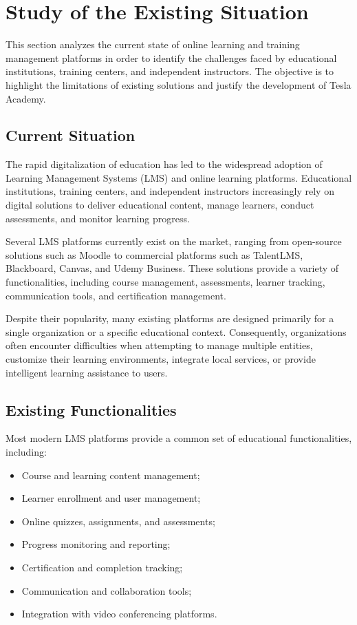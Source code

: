\section{Study of the Existing Situation}

This section analyzes the current state of online learning and training management
platforms in order to identify the challenges faced by educational institutions, training
centers, and independent instructors. The objective is to highlight the limitations of
existing solutions and justify the development of Tesla Academy.

\subsection{Current Situation}

The rapid digitalization of education has led to the widespread adoption of Learning
Management Systems (LMS) and online learning platforms. Educational institutions, training
centers, and independent instructors increasingly rely on digital solutions to deliver
educational content, manage learners, conduct assessments, and monitor learning progress.

Several LMS platforms currently exist on the market, ranging from open-source solutions
such as Moodle to commercial platforms such as TalentLMS, Blackboard, Canvas, and Udemy
Business. These solutions provide a variety of functionalities, including course management,
assessments, learner tracking, communication tools, and certification management.

Despite their popularity, many existing platforms are designed primarily for a single
organization or a specific educational context. Consequently, organizations often encounter
difficulties when attempting to manage multiple entities, customize their learning
environments, integrate local services, or provide intelligent learning assistance to users.

\subsection{Existing Functionalities}

Most modern LMS platforms provide a common set of educational functionalities, including:

\begin{itemize}
  \item Course and learning content management;
  \item Learner enrollment and user management;
  \item Online quizzes, assignments, and assessments;
  \item Progress monitoring and reporting;
  \item Certification and completion tracking;
  \item Communication and collaboration tools;
  \item Integration with video conferencing platforms.
\end{itemize}

